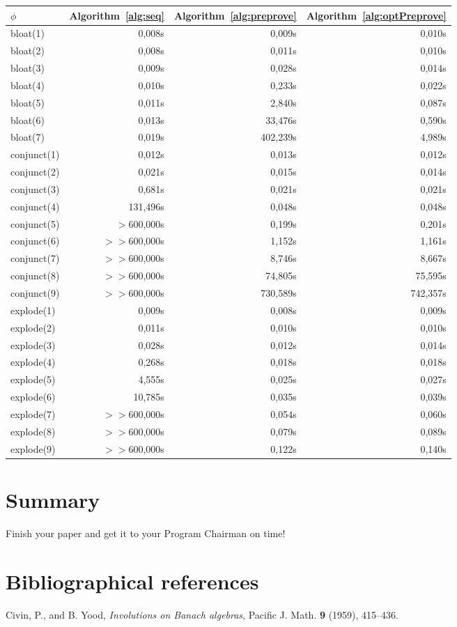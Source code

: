 \documentclass{entcs} \usepackage{entcsmacro}
\begin{document}
\begin{tabular}{| l | r | r | r |}
\hline
$\phi$ & Algorithm~\ref{alg:seq} & Algorithm~\ref{alg:preprove} & Algorithm~\ref{alg:optPreprove}  \\
\hline
 bloat(1) & 0,008s & 0,009s & 0,010s\\
 bloat(2) & 0,008s & 0,011s & 0,010s\\
 bloat(3) & 0,009s & 0,028s & 0,014s\\
 bloat(4) & 0,010s & 0,233s & 0,022s\\
 bloat(5) & 0,011s & 2,840s & 0,087s\\
 bloat(6) & 0,013s & 33,476s & 0,590s\\
 bloat(7) & 0,019s & 402,239s & 4,989s\\
\hline
 conjunct(1) & 0,012s & 0,013s & 0,012s\\
 conjunct(2) & 0,021s & 0,015s & 0,014s\\
 conjunct(3) & 0,681s & 0,021s & 0,021s\\
 conjunct(4) & 131,496s & 0,048s & 0,048s\\
 conjunct(5) & $>$600,000s & 0,199s & 0,201s\\
 conjunct(6) & $>>$600,000s & 1,152s & 1,161s\\
 conjunct(7) & $>>$600,000s & 8,746s & 8,667s\\
 conjunct(8) & $>>$600,000s & 74,805s & 75,595s\\
 conjunct(9) & $>>$600,000s & 730,589s & 742,357s\\
\hline
 explode(1) & 0,009s & 0,008s & 0,009s\\
 explode(2) & 0,011s & 0,010s & 0,010s\\
 explode(3) & 0,028s & 0,012s & 0,014s\\
 explode(4) & 0,268s & 0,018s & 0,018s\\
 explode(5) & 4,555s & 0,025s & 0,027s\\
 explode(6) & 10,785s & 0,035s & 0,039s\\
 explode(7) & $>>$600,000s & 0,054s & 0,060s\\
 explode(8) & $>>$600,000s & 0,079s & 0,089s\\
 explode(9) & $>>$600,000s & 0,122s & 0,140s\\
\hline

\end{tabular}

\section{Summary}  
\begin{problem}
  Finish your paper and get it to your Program Chairman on time!
\end{problem}

\section{Bibliographical references}\label{references}

\begin{thebibliography}{10}\label{bibliography}
 Civin, P., and B. Yood, \emph{Involutions on Banach
    algebras}, Pacific J. Math. \textbf{9} (1959), 415--436.
  
\end{thebibliography}
\end{document}
